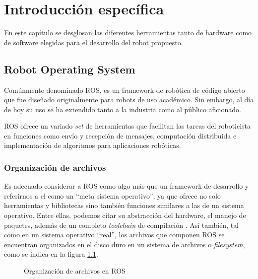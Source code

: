 \chapter{Introducción específica}

\label{Capitulo2}

En este capítulo se desglosan las diferentes herramientas tanto de hardware como de software elegidas para el desarrollo del robot propuesto.

\section{Robot Operating System}

Comúnmente denominado ROS, es un framework de robótica de código abierto que fue diseñado originalmente para robots de uso académico. Sin embargo, al día de hoy su uso se ha extendido tanto a la industria como al público aficionado.

ROS ofrece un variado \textit{set} de herramientas que facilitan las tareas del roboticista en funciones como envío y recepción de mensajes, computación distribuida e implementación de algoritmos para aplicaciones robóticas.

\subsection{Organización de archivos}\label{sec:organizacionArchivos}

Es adecuado considerar a ROS como algo más que un framework de desarrollo y referirnos a el como un ``meta sistema operativo'', ya que ofrece no solo herramientas y bibliotecas sino también funciones similares a las de un sistema operativo. Entre ellas, podemos citar su abstracción del hardware, el manejo de paquetes, además de un completo \textit{toolchain} de compilación \citep{BOOK:2}. Así también, tal como en un sistema operativo ``real'', los archivos que componen ROS se encuentran organizados en el disco duro en un sistema de archivos o \textit{filesystem}, como se indica en la figura \ref{fig:rosSistemaDeArchivos}.

\begin{figure}[ht]
    \centering
    \def\svgwidth{350pt}
    
    \caption{Organización de archivos en ROS}
    \label{fig:rosSistemaDeArchivos}
\end{figure}

